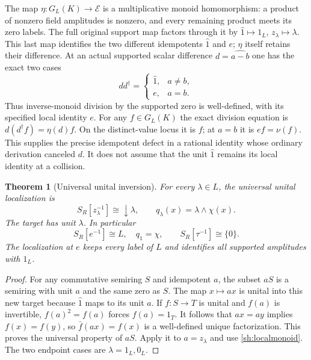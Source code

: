 \documentclass[11pt]{article}
\newtheorem{theorem}{Theorem}
\begin{document}
The map $\eta:G_L(K)\to\mathcal E$ is a multiplicative
monoid homomorphism: a product of nonzero field amplitudes
is nonzero, and every remaining product meets its zero labels.
The full original support map factors through it by
$\widehat1\mapsto1_L$, $z_\lambda\mapsto\lambda$.
This last map identifies the two different idempotents
$\widehat1$ and $e$; $\eta$ itself retains their difference.
At an actual supported scalar difference $d=\widehat{a-b}$
one has the exact two cases
\begin{equation}\tag{SH6c}\label{sh:collisionunit}
 dd^\dagger=
 \begin{cases}
 \widehat1,&a\ne b,\\
 e,&a=b.
 \end{cases}
\end{equation}
Thus inverse-monoid division by the supported zero is
well-defined, with its specified local identity $e$.
For any $f\in G_L(K)$ the exact division equation is
$d(d^\dagger f)=\eta(d)f$. On the distinct-value locus
it is $f$; at $a=b$ it is $ef=\nu(f)$.
This supplies the precise idempotent defect in a rational
identity whose ordinary derivation canceled $d$. It does
not assume that the unit $\widehat1$ remains its local
identity at a collision.

\begin{theorem}[Universal unital inversion]\label{sh:localization}
For every $\lambda\in L$, the universal unital localization is
\begin{equation}\tag{SH7}\label{sh:localize}
 S_R[z_\lambda^{-1}]\cong\downarrow\lambda,\qquad
 q_\lambda(x)=\lambda\wedge\chi(x).
\end{equation}
The target has unit $\lambda$. In particular
\begin{equation}\tag{SH8}\label{sh:elocalize}
 S_R[e^{-1}]\cong L,\quad q_1=\chi,\qquad
 S_R[\tau^{-1}]\cong\{0\}.
\end{equation}
The localization at $e$ keeps every label of $L$ and identifies
all supported amplitudes with $1_L$.
\end{theorem}
\begin{proof}
For any commutative semiring $S$ and idempotent $a$, the subset
$aS$ is a semiring with unit $a$ and the same zero as $S$.
The map $x\mapsto ax$ is unital into this new target because
$\widehat1$ maps to its unit $a$. If $f:S\to T$ is unital and
$f(a)$ is invertible, $f(a)^2=f(a)$ forces $f(a)=1_T$.
It follows that $ax=ay$ implies $f(x)=f(y)$, so
$\bar f(ax)=f(x)$ is a well-defined unique factorization.
This proves the universal property of $aS$.
Apply it to $a=z_\lambda$ and use \eqref{sh:localmonoid}.
The two endpoint cases are $\lambda=1_L,0_L$.
\end{proof}
\end{document}
